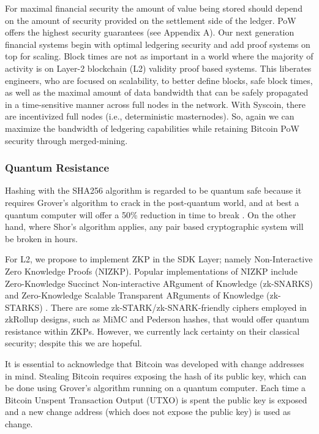 \documentclass[peerreview]{ieeesyscoin}
\begin{document}
For maximal financial security the amount of value being stored should depend on the amount of security provided on the settlement side of the ledger. PoW offers the highest security guarantees (see Appendix A). Our next generation financial systems begin with optimal ledgering security and add proof systems on top for scaling. Block times are not as important in a world where the majority of activity is on Layer-2 blockchain (L2) validity proof based systems. This liberates engineers, who are focused on scalability, to better define blocks, safe block times, as well as the maximal amount of data bandwidth that can be safely propagated in a time-sensitive manner across full nodes in the network. With Syscoin, there are incentivized full nodes (i.e., deterministic masternodes). So, again we can maximize the bandwidth of ledgering capabilities while retaining Bitcoin PoW security through merged-mining.


\subsubsection{Quantum Resistance}

Hashing with the SHA256 algorithm is regarded to be quantum safe because it requires Grover's algorithm to crack in the post-quantum world, and at best a quantum computer will offer a 50\% reduction in time to break \cite{Nai19}. On the other hand, where Shor’s algorithm applies, any pair based cryptographic system will be broken in hours.

For L2, we propose to implement ZKP in the SDK Layer; namely Non-Interactive Zero Knowledge Proofs (NIZKP). Popular implementations of NIZKP include Zero-Knowledge Succinct Non-interactive ARgument of Knowledge (zk-SNARKS) and Zero-Knowledge Scalable Transparent ARguments of Knowledge (zk-STARKS) \cite{Nas19}. There are some zk-STARK/zk-SNARK-friendly ciphers employed in zkRollup designs, such as MiMC and Pederson hashes, that would offer quantum resistance within ZKPs. However, we currently lack certainty on their classical security; despite this we are hopeful.

It is essential to acknowledge that Bitcoin was developed with change addresses in mind. Stealing Bitcoin requires exposing the hash of its public key, which can be done using Grover’s algorithm running on a quantum computer. Each time a Bitcoin Unspent Transaction Output (UTXO) is spent the public key is exposed and a new change address (which does not expose the public key) is used as change.
\end{document}
